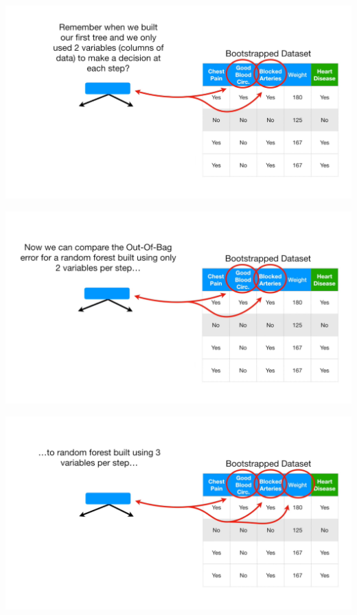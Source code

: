 \documentclass[
  ignorenonframetext,
]{beamer}
\begin{document}
\begin{frame}{}
\protect\hypertarget{section-89}{}
\includegraphics{images/r90.png}
\end{frame}

\begin{frame}{}
\protect\hypertarget{section-90}{}
\includegraphics{images/r91.png}
\end{frame}

\begin{frame}{}
\protect\hypertarget{section-91}{}
\includegraphics{images/r92.png}
\end{frame}
\end{document}
